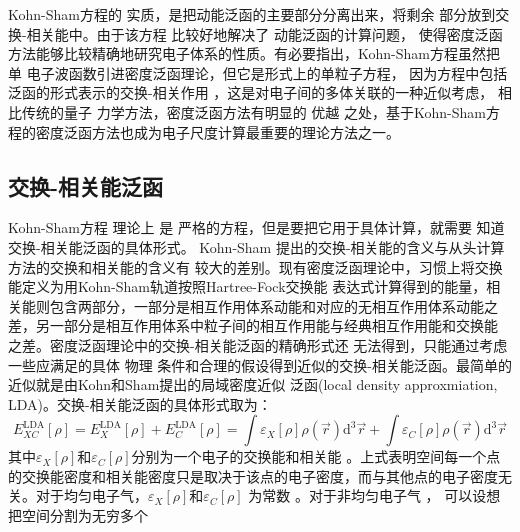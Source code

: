 {Kohn-Sham方程的%
实质，是把动能泛函的主要部分分离出来，将剩余%
部分放到交换-相关能中。由于该方程%
{比较好地}解决了%
动能泛函的{计算}问题，%
使得密度泛函方法能够比较精确地研究电子体系的性质。有必要指出，Kohn-Sham方程虽然把单%
电子波函数引进密度泛函理论，但它是{\heiti 形式上的单粒子方程}，%
因为方程中包括泛函的形式表示的交换-相关作用%
，这是对电子间的多体关联的一种近似考虑，%
{相比}传统的量子%
{力}学方法，密度泛函方法有明显的%
优越%
{之处}，基于Kohn-Sham方程的密度泛函方法也成为电子尺度计算最重要的{理论}方法之一。

\subsection{交换-相关能泛函}
Kohn-Sham方程%
理论上%
是%
严格的方程，但是要把它用于具体计算，就需要%
{知道}交换-相关能泛函的具体形式。%
Kohn-Sham%
提出的交换-相关能的含义与从头计算方法的交换和相关能的含义有%
{较}大的差别{。现有}密度泛函理论中，习惯上将交换能定义为用Kohn-Sham轨道按照Hartree-Fock交换能%
{表达}式计算得到的能量，相关能则包含两部分，一部分是相互作用体系动能和对应的无相互作用体系动能{之}差，另一部分是相互作用体系中粒子间的相互作用能与经典相互作用{能}和交换能%
{之}差。密度泛函{理论}中的交换-相关能泛函的精确形式还%
{无法}得到，只能通过{考虑}一些{应满足的}具体%
物理%
{条件}和合理的假设得到近似的交换-相关能泛函。最简单的近似就是由Kohn和Sham提出的局域密度近似%
{泛函}(local density approxmiation, LDA)\cite{PR140-A1133_1965}{。}交换-相关能{泛函}的具体形式取为：
\begin{equation}
  \label{eq:dft-5}
  E_{XC}^{\mathrm{LDA}}[\rho]=E_X^{\mathrm{LDA}}[\rho]+E_C^{\mathrm{LDA}}[\rho]=\int\varepsilon_X[\rho]\rho(\vec{r}) \textrm{d}^3\vec{r}+\int\varepsilon_C[\rho]\rho(\vec{r}) \textrm{d}^3\vec{r}
\end{equation}
其中$\varepsilon_X[\rho]$和$\varepsilon_C[\rho]$分别为{一个电子的}交换能和相关能%
。上式表明空间每一个点的交换能密度和相关能密度只是取决于该点的电子密度，而与其他点的电子密度无关。对{于均匀电子气，}$\varepsilon_X[\rho]$和$\varepsilon_C[\rho]$%
{为常数%
。}对于非均匀电子气%
，%
{可以设想}把空间分割为无穷多个%
}
